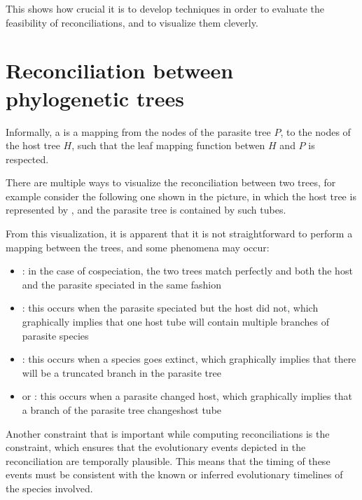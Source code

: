 \documentclass[a4paper, 12pt]{report}
\begin{document}
    This shows how crucial it is to develop techniques in order to evaluate the feasibility of reconciliations, and to visualize them cleverly.

    \section{Reconciliation between phylogenetic trees}

    Informally, a  is a mapping from the nodes of the parasite tree $P$, to the nodes of the host tree $H$, such that the leaf mapping function betwen $H$ and $P$ is respected.


    There are multiple ways to visualize the reconciliation between two trees, for example consider the following one shown in the picture, in which the host tree is represented by , and the parasite tree is contained by such tubes.


    From this visualization, it is apparent that it is not straightforward to perform a mapping between the trees, and some phenomena may occur:

    \begin{itemize}
        \item {}: in the case of cospeciation, the two trees match perfectly and both the host and the parasite speciated in the same fashion
        \item {}: this occurs when the parasite speciated but the host did not, which graphically implies that one host tube will contain multiple branches of parasite species
        \item {}: this occurs when a species goes extinct, which graphically implies that there will be a truncated branch in the parasite tree
        \item {} or : this occurs when a parasite changed host, which graphically implies that a branch of the parasite tree changeshost tube
    \end{itemize}

    Another constraint that is important while computing reconciliations is the  constraint, which ensures that the evolutionary events depicted in the reconciliation are temporally plausible. This means that the timing of these events must be consistent with the known or inferred evolutionary timelines of the species involved.
\end{document}
